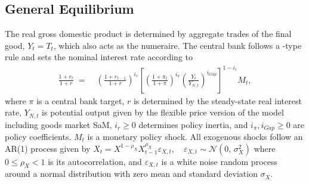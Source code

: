 \documentclass[12pt,3p,authoryear,review]{elsarticle}
\begin{document}
\subsection{General Equilibrium}%
The real gross domestic product is determined by aggregate trades of the final good, $Y_t = T_t$, which also acts as the numeraire. The central bank follows a \cite{taylorDiscretionPolicyRules1993}-type rule and sets the nominal interest rate according to%
\begin{align}\label{eq:Taylor_rule}%
	\frac{1+r_t}{1+r} \; = & \; \left( \frac{1+r_{t-1}}{1+r} \right)^{i_r} \left[ \left( \frac{1+\pi_t}{1+\pi} \right)^{i_\pi} \left( \frac{Y_t}{Y_{N,t}} \right)^{i_{Gap}} \right]^{1-i_r} M_t,%
\end{align}
where $\pi$ is a central bank target, $r$ is determined by the steady-state real interest rate, $Y_{N,t}$ is potential output given by the flexible price version of the model including goods market SaM, $i_r\geq0$ determines policy inertia, and $i_\pi, i_{Gap}\geq 0$ are policy coefficients. $M_t$ is a monetary policy shock. All exogenous shocks follow an AR(1) process given by $X_t = X^{1-\rho_X} X_{t-1}^{\rho_X} \varepsilon_{X,t}, \quad \varepsilon_{X,t} \sim \mathcal{N}(0,\,\sigma_X^{2})$ where $0\leq\rho_X<1$ is its autocorrelation, and $\varepsilon_{X,t}$ is a white noise random process around a normal distribution with zero mean and standard deviation $\sigma_X$.%
\end{document}
